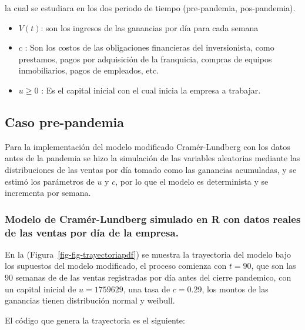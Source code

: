 \documentclass[
  us-letterpaper,
]{scrreprt}
\theoremstyle{plain}
\theoremstyle{plain}
\theoremstyle{definition}
\theoremstyle{remark}
\begin{document}
la cual se estudiara en los dos periodo de tiempo (pre-pandemia,
pos-pandemia).

\begin{itemize}
\item
  \(V(t)\): son los ingresos de las ganancias por día para cada semana
\item
  \(c\) : Son los costos de las obligaciones financieras del
  inversionista, como prestamos, pagos por adquisición de la franquicia,
  compras de equipos inmobiliarios, pagos de empleados, etc.
\item
  \(u \geq 0\) : Es el capital inicial con el cual inicia la empresa a
  trabajar.
\end{itemize}

\subsection{Caso pre-pandemia}\label{caso-pre-pandemia}

Para la implementación del modelo modificado Cramér-Lundberg con los
datos antes de la pandemia se hizo la simulación de las variables
aleatorias mediante las distribuciones de las ventas por día tomado como
las ganancias acumuladas, y se estimó los parámetros de \(u\) y \(c\),
por lo que el modelo es determinista y se incrementa por semana.

\subsubsection{Modelo de Cramér-Lundberg simulado en R con datos reales
de las ventas por día de la
empresa.}\label{modelo-de-cramuxe9r-lundberg-simulado-en-r-con-datos-reales-de-las-ventas-por-duxeda-de-la-empresa.}

En la (Figura~\ref{fig-fig-trayectoriapdf}) se muestra la trayectoria
del modelo bajo los supuestos del modelo modificado, el proceso comienza
con \(t = 90\), que son las \(90\) semanas de de las ventas registradas
por día antes del cierre pandemico, con un capital inicial de
\(u= 1759629\), una tasa de \(c= 0.29\), los montos de las ganancias
tienen distribución normal y weibull.

El código que genera la trayectoria es el siguiente:
\end{document}
